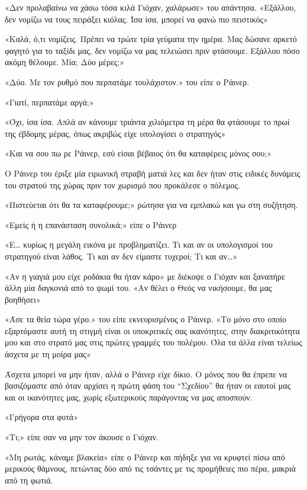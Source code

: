 \documentclass[12pt,twoside, openany]{book}
\begin{document}
«Δεν προλαβαίνω να χάσω τόσα κιλά Γιόχαν, χαλάρωσε» του απάντησα. «Εξάλλου, δεν νομίζω να τους πειράξει κιόλας. Ίσα ίσα, μπορεί να φανώ πιο πειστικός»

«Καλά, ό,τι νομίζεις. Πρέπει να τρώτε τρία γεύματα την ημέρα. Μας δώσανε αρκετό φαγητό για το ταξίδι μας, δεν νομίζω να μας τελειώσει πριν φτάσουμε. Εξάλλου πόσο ακόμη θέλουμε. Μία; Δύο μέρες;»

«Δύο. Με τον ρυθμό που περπατάμε τουλάχιστον.» του είπε ο Ράινερ.

«Γιατί, περπατάμε αργά;»

«Όχι, ίσα ίσα. Απλά αν κάνουμε τριάντα χιλιόμετρα τη μέρα θα φτάσουμε το πρωί της έβδομης μέρας, όπως ακριβώς είχε υπολογίσει ο στρατηγός»

«Και να σου πω ρε Ράινερ, εσύ είσαι βέβαιος ότι θα καταφέρεις μόνος σου;»

Ο Ράινερ του έριξε μία ειρωνική στραβή ματιά λες και δεν ήταν στις ειδικές δυνάμεις του στρατού της χώρας πριν τον χωρισμό που προκάλεσε ο πόλεμος.

«Πιστεύεται ότι θα τα καταφέρουμε;» ρώτησα για να εμπλακώ και γω στη συζήτηση.

«Εμείς ή η επανάσταση συνολικά;» είπε ο Ράινερ

«Ε… κυρίως η μεγάλη εικόνα με προβληματίζει. Τι και αν οι υπολογισμοί του στρατηγού είναι λάθος. Τι και αν δεν είμαστε τυχεροί; Τι και αν…»

«Αν η γιαγιά μου είχε ροδάκια θα ήταν κάρο» με διέκοψε ο Γιόχαν και ξαναπήρε άλλη μία δαγκονιά από  το ψωμί του. «Αν θέλει ο Θεός να νικήσουμε, θα μας βοηθήσει»

«Άσε τα θεία τώρα γέρο.» του είπε εκνευρισμένος ο Ράινερ. «Το μόνο στο οποίο εξαρτόμαστε αυτή τη στιγμή είναι οι υποκριτικές σας ικανότητες, στην διακριτικότητα μου και στο στρατό μας στις πρώτες γραμμές του πολέμου. Όλα τα άλλα είναι τελείως άσχετα με τη μοίρα μας»

Άσχετα μπορεί να μην ήταν, αλλά ο Ράινερ είχε δίκιο. Ο μόνος που θα έπρεπε να βασιζόμαστε από όταν αρχίσει η πρώτη φάση του “Σχεδίου” θα ήταν οι εαυτοί μας και οι ικανότητες μας, χωρίς εξωτερικούς παράγοντας να μας αποσπούν. 

«Γρήγορα στα φυτά»

«Τι;» είπε σαν να μην τον άκουσε ο Γιόχαν.

«Μη ρωτάς, κάναμε βλακεία» είπε ο Ράινερ και πήδηξε για να κρυφτεί πίσω από μερικούς θάμνους, πετώντας δύο από τις τσάντες με τις προμήθειες πιο πέρα, μακριά από τη φωτιά. 
\end{document}
